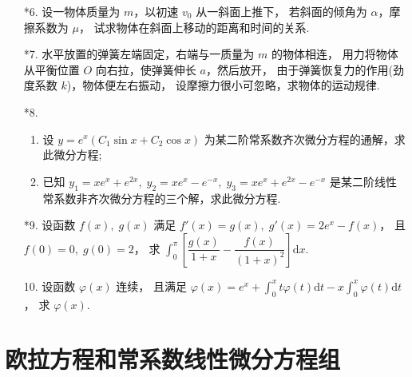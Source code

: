 \begin{enumerate}
    \item[*6.] 设一物体质量为 $m$，以初速 $v_0$ 从一斜面上推下，
    若斜面的倾角为 $\alpha$，摩擦系数为 $\mu$，
    试求物体在斜面上移动的距离和时间的关系.

    \item[*7.] 水平放置的弹簧左端固定，右端与一质量为 $m$ 的物体相连，
    用力将物体从平衡位置 $O$ 向右拉，使弹簧伸长 $a$，然后放开，
    由于弹簧恢复力的作用(劲度系数 $k$)，物体便左右振动，
    设摩擦力很小可忽略，求物体的运动规律.

    \item[*8.]
    \begin{enumerate}[(1)]\setlength{\itemsep}{5pt}\setlength{\topsep}{15pt}
        \item 设 $y=e^x(C_1\sin x+C_2\cos x)$ 为某二阶常系数齐次微分方程的通解，求此微分方程;
        \item 已知 $y_1=xe^x+e^{2x},\;y_2=xe^x-e^{-x},\;y_3=xe^x+e^{2x}-e^{-x}$ 
        是某二阶线性常系数非齐次微分方程的三个解，求此微分方程.
    \end{enumerate}

    \item[*9.] 设函数 $f(x),\;g(x)$ 满足 $f'(x)=g(x),\;g'(x)=2e^x-f(x)$，
    且 $f(0)=0,\;g(0)=2$，
    求 $\displaystyle\int_0^{\pi}\left[\dfrac{g(x)}{1+x}-\dfrac{f(x)}{(1+x)^2}\right]\text{d}x$.

    \item[10.] 设函数 $\varphi(x)$ 连续，
    且满足 $\displaystyle\varphi(x)=e^x+\int_0^xt\varphi(t)\text{d}t-x\int_0^x\varphi(t)\text{d}t$，
    求 $\varphi(x)$.

\end{enumerate}

\section{欧拉方程和常系数线性微分方程组}

